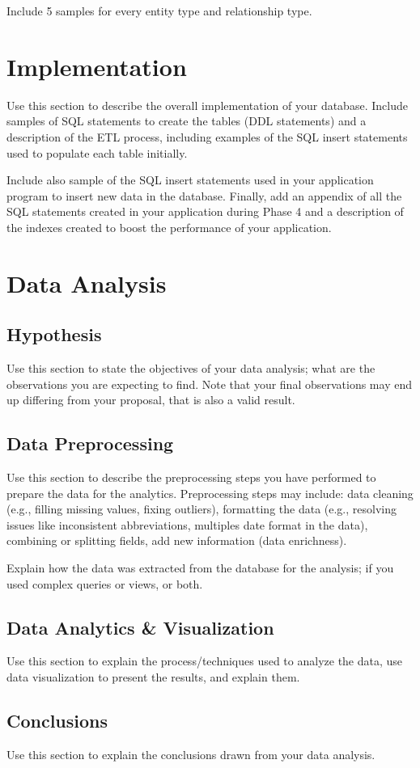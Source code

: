 \documentclass[12pt]{article}
\begin{document}
Include 5 samples for every entity type and relationship type.

\section{Implementation}
Use this section to describe the overall implementation of your database. Include samples of SQL statements to create the tables (DDL statements) and a description of the ETL process, including examples of the SQL insert statements used to populate each table initially.

Include also sample of the SQL insert statements used in your application program to insert new data in the database. Finally, add an appendix of all the SQL statements created in your application during Phase 4 and a description of the indexes created to boost the performance of your application.
\section{Data Analysis}
\subsection{Hypothesis}
Use this section to state the objectives of your data analysis; what are the observations you are expecting to find. Note that your final
observations may end up differing from your proposal, that is also a valid result.
\subsection{Data Preprocessing}
Use this section to describe the preprocessing steps you have performed to prepare the data for the analytics. Preprocessing steps may include: data cleaning (e.g., filling missing values, fixing outliers), formatting the data (e.g., resolving issues like inconsistent abbreviations, multiples date format in the data), combining or splitting fields, add new information (data enrichness).

Explain how the data was extracted from the database for the analysis; if you used complex queries or views, or both.
\subsection{Data Analytics \& Visualization}
Use this section to explain the process/techniques used to analyze the data, use data visualization to present the results, and explain them.
\subsection{Conclusions}
Use this section to explain the conclusions drawn from your data analysis.\\
\end{document}
